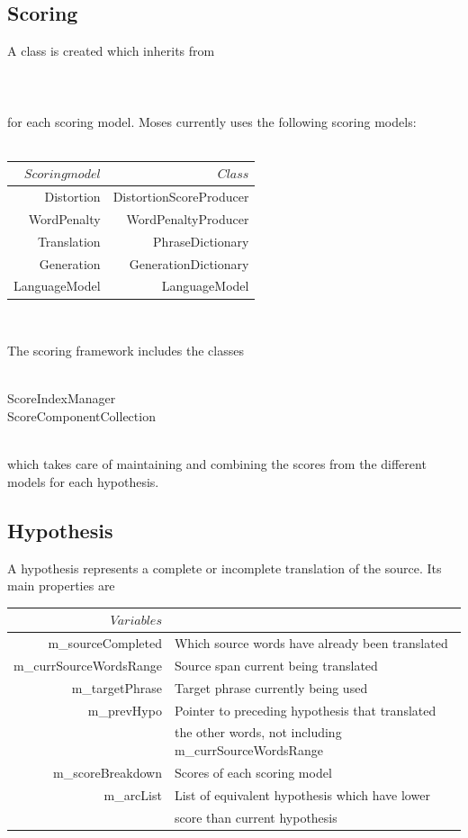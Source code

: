 \documentclass[11pt]{report}
\theoremstyle{plain}
\begin{document}
{\subsection{Scoring}
A class is created which inherits from\\
\\
\\
\\
for each scoring model. Moses currently uses the following scoring models:\\
\\
\begin{center}
\begin{tabular}{|r|r|}
\hline
$ Scoring model $&$ Class $\\
\hline
Distortion	& DistortionScoreProducer\\
WordPenalty	& WordPenaltyProducer\\
Translation	& PhraseDictionary\\
Generation	& GenerationDictionary\\
LanguageModel	& LanguageModel\\
\hline
\end{tabular}\\
\end{center}

The scoring framework includes the classes \\
\\
\begin{tt}
\indent ScoreIndexManager\\
\indent	ScoreComponentCollection\\
\end{tt}
\\
which takes care of maintaining and combining the scores from the different models for each hypothesis.
\subsection{Hypothesis}
A hypothesis represents a complete or incomplete translation of the source. Its main properties are
\begin{center}
\begin{tabular}{|r|l|}
\hline
$ Variables $&$ $\\
\hline
m\_sourceCompleted & Which source words have already been translated\\
m\_currSourceWordsRange & Source span current being translated\\
m\_targetPhrase & Target phrase currently being used\\
m\_prevHypo & Pointer to preceding hypothesis that translated \\
 & the other words, not including m\_currSourceWordsRange\\
m\_scoreBreakdown & Scores of each scoring model\\
m\_arcList & List of equivalent hypothesis which have lower\\
 & score than current hypothesis\\
\hline
\end{tabular}\\
\end{center}

}
\end{document}
